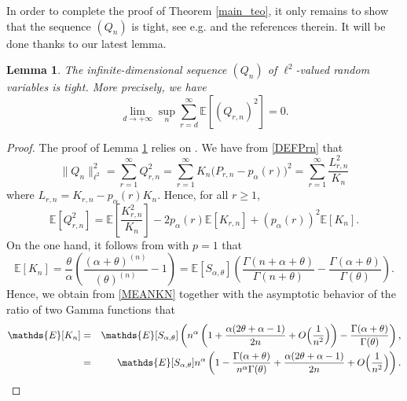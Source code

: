 \documentclass[twoside,12pt]{article}
\newcommand{\E}{\mathds{E}}
\newtheorem{lem}[thm]{Lemma}
\begin{document}
In order to complete the proof of Theorem \ref{main_teo}, it only remains to show that the sequence 
$(Q_n)$ is tight, see e.g. \citet[Chapter 10]{Led(11)} and the references therein. It will be done thanks to our latest lemma.

\begin{lem}
\label{L-IDCLT}
The infinite-dimensional sequence $(Q_n)$ of $\ell^{2}$-valued random variables is tight. More precisely, we have
\begin{equation}\label{toprove}
\lim_{d\rightarrow+\infty}\sup_{n}\sum_{r=d}^\infty\E[(Q_{r,n})^{2}]=0.
\end{equation}
\end{lem}

\begin{proof}
The proof of Lemma \ref{L-IDCLT} relies on \citet[Theorem 2.3.3 and Corollary 2.3.1]{Kal(95)}.
We have from \eqref{DEFPrn} that
\begin{equation}
\label{NORML2}
\| Q_n \|_{\ell^{2}}^2= \sum_{r=1}^\infty Q_{r,n}^2= \sum_{r=1}^\infty K_{n}\big(P_{r,n}-p_{\alpha}(r)\big)^2
=\sum_{r=1}^\infty \frac{L_{r,n}^2}{K_{n}}
\end{equation}
where $L_{r,n}=K_{r,n}-p_{\alpha}(r)K_n$.
Hence, for all $r \geq 1$,
\begin{equation}\label{eq:main}
\E[Q_{r,n}^{2}]=\E\left[\frac{K_{r,n}^{2}}{K_{n}}\right]-2p_{\alpha}(r)\E[K_{r,n}]+(p_{\alpha}(r))^{2}\E[K_{n}].
\end{equation}
On the one hand, it follows from \citet[Equations 33]{Ber(24)} with $p=1$ that
\begin{equation}
\label{MEANKN}
\E[K_{n}] =\frac{\theta}{\alpha}\left(\frac{(\alpha+\theta)^{(n)}}{(\theta)^{(n)}}-1\right)
= \E[S_{\alpha, \theta}] \left(\frac{\Gamma(n+\alpha+\theta)}{\Gamma(n+\theta)}-\frac{\Gamma(\alpha+\theta)}{\Gamma(\theta)}\right).
\end{equation}
Hence, we obtain from \eqref{MEANKN} together with the asymptotic behavior of the ratio of two Gamma functions that
\begin{eqnarray}\label{AEMEANKN}
\E[K_{n}] &=& \E[S_{\alpha, \theta}] \left(n^\alpha \left(1+ \frac{\alpha(2 \theta + \alpha -1)}{2n} + O\Big(\frac{1}{n^2}\Big) \right)-\frac{\Gamma(\alpha+\theta)}{\Gamma(\theta)}\right),  \notag\\
&=& \E[S_{\alpha, \theta}] n^\alpha \left(1  -\frac{\Gamma(\alpha+\theta)}{n^\alpha\Gamma(\theta)} +\frac{\alpha(2 \theta + \alpha -1)}{2n} + O\Big(\frac{1}{n^2}\Big) \right).
\end{eqnarray}

\end{proof}
\end{document}
